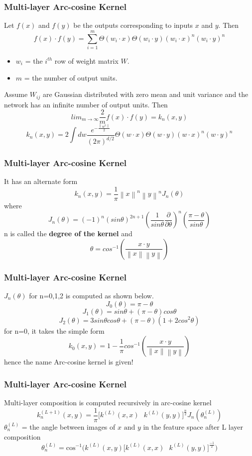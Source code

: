 \documentclass[a4paper,compress,svgnames]{beamer}
\begin{document}
\begin{frame}
\frametitle{Multi-layer Arc-cosine Kernel}
Let $f(x)$ and $f(y)$ be the outputs corresponding to inputs $x$ and $y$. Then
\[ f(x)\cdot f(y) = \sum_{i=1}^m \Theta(w_i\cdot x) \Theta(w_i\cdot y)(w_i\cdot x)^n (w_i\cdot y)^n\]
\begin{itemize}
\item $w_i$ = the $i^{th}$ row of weight matrix $W$. 
\item  $m$ = the number of output units.
\end{itemize}
Assume $W_{ij}$ are Gaussian distributed with zero mean and unit variance and the network has an infinite number of output units. Then
\[ lim_{m\rightarrow \infty} \frac{2}{m}f(x)\cdot f(y) = k_n(x,y) \]
\[ k_n(x,y) = 2\int dw \frac{e^{-\frac{\left \| w^2 \right \|}{2}}}{(2\pi )^{d/2}} \Theta (w\cdot x) \Theta (w\cdot y) (w\cdot x)^n (w\cdot y)^n\]
\end{frame}

\begin{frame}
\frametitle{Multi-layer Arc-cosine Kernel}
It has an alternate form
\[ k_n(x,y) = \frac{1}{\pi}\left \| x \right \|^n \left \| y \right \|^n J_n(\theta) \]
where
\[ J_n(\theta) = (-1)^n(sin\theta)^{2n+1} \left ( \frac{1}{sin\theta} \frac{\partial}{\partial \theta} \right )^n \left ( \frac{\pi-\theta}{sin\theta} \right ) \]
n is called the \textbf{degree of the kernel} and
\[ \theta = cos^{-1}\left ( \frac{x\cdot y}{\left \| x \right \| \left \| y \right \|} \right ) \]
\end{frame}

\begin{frame}
\frametitle{Multi-layer Arc-cosine Kernel}
$J_n(\theta)$ for n=0,1,2 is computed as shown below.
\[ J_0(\theta) = \pi-\theta \]
\[ J_1(\theta) = sin\theta + (\pi-\theta)cos\theta \]
\[ J_2(\theta) = 3sin\theta cos\theta + (\pi-\theta)(1+2cos^2\theta) \]
for n=0, it takes the simple form
\[k_0(x,y) =  1- \frac{1}{\pi}cos^{-1}\left ( \frac{x\cdot y}{\left \| x \right \| \left \| y \right \|} \right )  \]
hence the name Arc-cosine kernel is given!
\end{frame}

\begin{frame}
\frametitle{Multi-layer Arc-cosine Kernel}
Multi-layer composition is computed recursively in arc-cosine kernel
\[ k^{(L+1)}_n(x,y) = \frac{1}{\pi} \Bigg[ k^{(L)}(x,x) \textrm{ } k^{(L)}(y,y)\Bigg]^{\frac{n}{2}} J_n(\theta_n^{(L)}) \]
$\theta_n^{(L)}$ =  the angle between images of $x \textrm{ and } y$ in the feature space after L layer composition
\[ \theta_n^{(L)} = \textrm{cos}^{-1}\Bigg( k^{(L)}(x,y) \Bigg[ k^{(L)}(x,x) \textrm{ } k^{(L)}(y,y)\Bigg]^{\frac{-1}{2}} \Bigg) \]
\end{frame}
\end{document}
